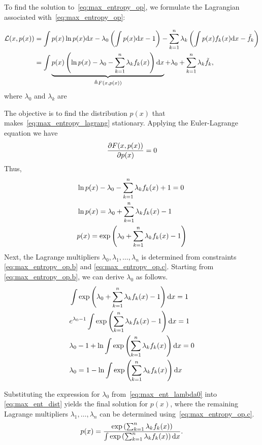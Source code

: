\documentclass{article}
\begin{document}
\begin{tcolorbox}[breakable,enhanced,colback=gray!10!white,colframe=gray!50!black,
title={Maximum Entropy Principle Solution}]
To find the solution to~\eqref{eq:max_entropy_op}, we formulate the Lagrangian associated with~\eqref{eq:max_entropy_op}:

\begin{align}\label{eq:max_entropy_lagrang}
    {\mathcal L}(x, p(x)) &= \int p(x) \ln p(x) {\rm d}x - \lambda_0 \left(\int p(x) {\rm d}x -1\right) - \sum_{k=1}^n \lambda_k \left(\int p(x) f_k(x) {\rm d}x - \tilde f_k\right)\\
    & =\int \underbrace{ p(x) \left(\ln p(x) - \lambda_0 - \sum_{k=1}^n \lambda_k f_k(x) \right) {\rm d}x}_{\triangleq F(x, p(x))} + \lambda_0 + \sum_{k=1}^n \lambda_k \tilde f_k,
\end{align}
where $\lambda_0$ and $\lambda_k$ are 

The objective is to find the distribution $p(x)$ that makes~\eqref{eq:max_entropy_lagrang} stationary. Applying the Euler-Lagrange equation we have
\begin{align*}
    \frac{\partial F(x, p(x))}{\partial p(x)} = 0
\end{align*}
Thus,
\begin{align}
    &\ln p(x) - \lambda_0 - \sum_{k=1}^n \lambda_k f_k(x) + 1 = 0\nonumber\\
    &\ln p(x) = \lambda_0 + \sum_{k=1}^n \lambda_k f_k(x) - 1\nonumber\\
    &p(x) = \exp\left(\lambda_0 + \sum_{k=1}^n \lambda_k f_k(x) - 1\right)\label{eq:max_ent_dist}
\end{align}
Next, the Lagrange multipliers $\lambda_0, \lambda_1, \ldots, \lambda_n$ is determined from constraints \eqref{eq:max_entropy_op.b} and \eqref{eq:max_entropy_op.c}. Starting from \eqref{eq:max_entropy_op.b}, we can derive $\lambda_0$ as follows.
\begin{align}
    &\int \exp\left(\lambda_0 + \sum_{k=1}^n \lambda_k f_k(x) - 1\right) {\rm d}x = 1 \nonumber \\
    &e^{\lambda_0 - 1} \int \exp\left(\sum_{k=1}^n \lambda_k f_k(x) - 1\right){\rm d}x = 1\nonumber\\
    & \lambda_0 - 1 + \ln \int \exp\left(\sum_{k=1}^n \lambda_k f_k(x) \right){\rm d}x = 0\nonumber\\
    & \lambda_0 = 1 - \ln \int \exp\left(\sum_{k=1}^n \lambda_k f_k(x) \right){\rm d}x\label{eq:max_ent_lambda0}
\end{align}

Substituting the expression for \(\lambda_0\) from~\eqref{eq:max_ent_lambda0} into \eqref{eq:max_ent_dist} yields the final solution for $p(x)$, where the remaining Lagrange multipliers \(\lambda_1, \ldots, \lambda_n\) can be determined using~\eqref{eq:max_entropy_op.c}.
\begin{align*}
    p(x) = \frac{\exp\left( \sum_{k=1}^n \lambda_k f_k(x) \right)}{\int \exp\left(\sum_{k=1}^n \lambda_k f_k(x)\right){\rm d}x}.
\end{align*}
\end{tcolorbox}

\newpage
 
 
\end{document}
